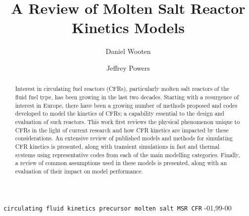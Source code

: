 \documentclass[review]{elsarticle}
\begin{document}
\begin{frontmatter}

\title{A Review of Molten Salt Reactor Kinetics Models}


\author[ucb]{Daniel Wooten}
\address[ucb]{4155 Etcheverry Hall, MC 1730, University of California, Berkeley,
    Berkeley, CA 94720-1730, United States}

\author[ornl]{Jeffrey Powers}
\address[ornl]{Oak Ridge National Laboratory, Oak Ridge, TN 37831, United States}

\begin{abstract}
Interest in circulating fuel reactors (CFRs), particularly molten salt reactors
of the fluid fuel type, has been growing in the last two decades. Starting 
with a
resurgence of interest in Europe, there have been a growing
number of methods proposed and codes developed to model the kinetics of CFRs;
a capability essential to the design and evaluation of such reactors. This work
first reviews the physical phenomenon unique to CFRs in the light of current
research and how CFR kinetics are impacted by these considerations.
 An extensive review of published models and methods for simulating CFR kinetics
is presented, along with transient simulations in fast and thermal systems using
representative codes from each of the main modelling categories. Finally, a
review of common assumptions used in these models is presented, along with an
evaluation of their impact on model performance. 
\end{abstract}

\begin{keyword}
\texttt{circulating fluid kinetics precursor molten salt MSR CFR}
-01\sep  99-00
\end{keyword}

\end{frontmatter}
\end{document}
